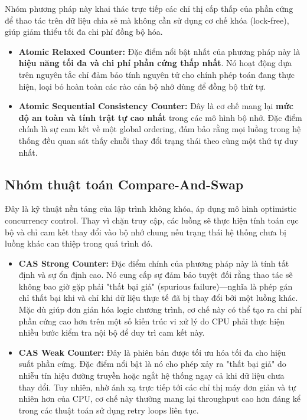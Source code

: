 Nhóm phương pháp này khai thác trực tiếp các chỉ thị cấp thấp của phần cứng để thao tác trên dữ liệu chia sẻ mà không cần sử dụng cơ chế khóa (lock-free), giúp giảm thiểu tối đa chi phí đồng bộ hóa.

\begin{itemize}
    \item \textbf{Atomic Relaxed Counter:} 
    Đặc điểm nổi bật nhất của phương pháp này là \textbf{hiệu năng tối đa và chi phí phần cứng thấp nhất}. Nó hoạt động dựa trên nguyên tắc chỉ đảm bảo tính nguyên tử cho chính phép toán đang thực hiện, loại bỏ hoàn toàn các rào cản bộ nhớ dùng để đồng bộ thứ tự.
    
    \item \textbf{Atomic Sequential Consistency Counter:} Đây là cơ chế mang lại \textbf{mức độ an toàn và tính trật tự cao nhất} trong các mô hình bộ nhớ. Đặc điểm chính là sự cam kết về một global ordering, đảm bảo rằng mọi luồng trong hệ thống đều quan sát thấy chuỗi thay đổi trạng thái theo cùng một thứ tự duy nhất. 
\end{itemize}

\subsection{Nhóm thuật toán Compare-And-Swap}

Đây là kỹ thuật nền tảng của lập trình không khóa, áp dụng mô hình optimistic concurrency control. Thay vì chặn truy cập, các luồng sẽ thực hiện tính toán cục bộ và chỉ cam kết thay đổi vào bộ nhớ chung nếu trạng thái hệ thống chưa bị luồng khác can thiệp trong quá trình đó.

\begin{itemize}
    \item \textbf{CAS Strong Counter:} 
    Đặc điểm chính của phương pháp này là tính tất định và sự ổn định cao. Nó cung cấp sự đảm bảo tuyệt đối rằng thao tác sẽ không bao giờ gặp phải "thất bại giả" (spurious failure)—nghĩa là phép gán chỉ thất bại khi và chỉ khi dữ liệu thực tế đã bị thay đổi bởi một luồng khác. Mặc dù giúp đơn giản hóa logic chương trình, cơ chế này có thể tạo ra chi phí phần cứng cao hơn trên một số kiến trúc vi xử lý do CPU phải thực hiện nhiều bước kiểm tra nội bộ để duy trì cam kết này.

    \item \textbf{CAS Weak Counter:} 
    Đây là phiên bản được tối ưu hóa tối đa cho hiệu suất phần cứng. Đặc điểm nổi bật là nó cho phép xảy ra "thất bại giả" do nhiễu tín hiệu đường truyền hoặc ngắt hệ thống ngay cả khi dữ liệu chưa thay đổi. Tuy nhiên, nhờ ánh xạ trực tiếp tới các chỉ thị máy đơn giản và tự nhiên hơn của CPU, cơ chế này thường mang lại throughput cao hơn đáng kể trong các thuật toán sử dụng retry loops liên tục.
\end{itemize}


